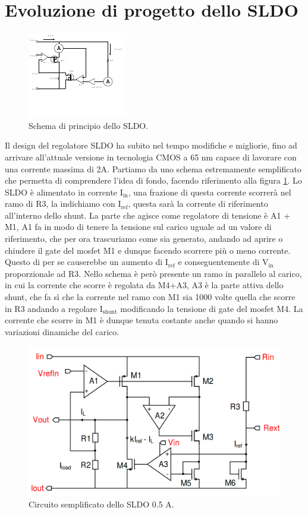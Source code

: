 \section{Evoluzione di progetto dello SLDO}
\begin{figure}[!htbp]
\centering
\includegraphics[scale=3.5]{Immagini/SLDObase}
\caption{Schema di principio dello SLDO.}
\label{SLDOprova}
\end{figure}

Il design del regolatore SLDO ha subito nel tempo modifiche e migliorie, fino ad arrivare all'attuale versione in tecnologia CMOS a 65 nm capace di lavorare con una corrente massima di 2A.
Partiamo da uno schema estremamente semplificato che permetta di comprendere l'idea di fondo, facendo riferimento alla figura \ref{SLDOprova}. 
Lo SLDO è alimentato in corrente $\mathrm{I_{in}}$, una frazione di questa corrente scorrerà nel ramo di R3, la indichiamo con $\mathrm{I_{ref}}$, questa sarà la corrente di riferimento all'interno dello shunt. 
La parte che agisce come regolatore di tensione è A1 + M1, A1 fa in modo di tenere la tensione sul carico uguale ad un valore di riferimento, che per ora trascuriamo come sia generato, andando ad aprire o chiudere il gate del mosfet M1 e dunque facendo scorrere più o meno corrente. 
Questo di per se causerebbe un aumento di $\mathrm{I_{ref}}$ e conseguentemente di $\mathrm{V_{in}}$ proporzionale ad R3. Nello schema è però presente un ramo in parallelo al carico, in cui la corrente che scorre è regolata da M4+A3, A3 è la parte attiva dello shunt, che fa sì che la corrente nel ramo con M1 sia 1000 volte quella che scorre in R3 andando a regolare $\mathrm{I_{shunt}}$ modificando la tensione di gate del mosfet M4. 
La corrente che scorre in M1 è dunque tenuta costante anche quando si hanno variazioni dinamiche del carico.

\begin{figure}
\centering
\includegraphics[scale=.3]{Immagini/SLDO5A}
\caption{Circuito semplificato dello SLDO 0.5 A.}
\label{SLDO5A}
\end{figure}

